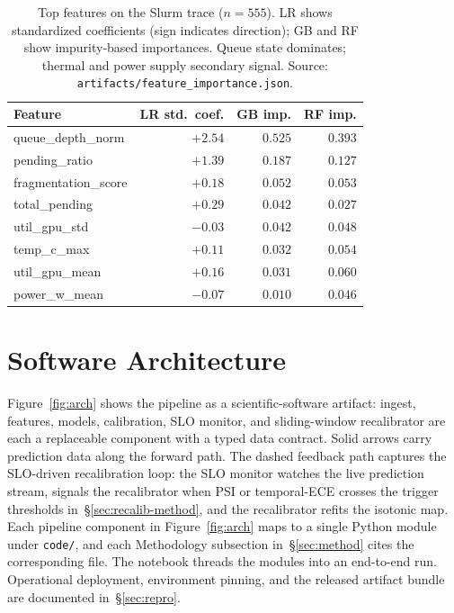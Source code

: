 \documentclass[conference]{IEEEtran}
\begin{document}
\begin{table}[!htbp]
\centering
\caption{Top features on the Slurm trace ($n=555$). LR shows standardized coefficients (sign indicates direction); GB and RF show impurity-based importances. Queue state dominates; thermal and power supply secondary signal. Source: \texttt{artifacts/feature\_importance.json}.}
\label{tab:featimp}
\scriptsize
\setlength{\tabcolsep}{4pt}
\begin{tabular}{@{}lrrr@{}}
\toprule
\textbf{Feature} & \textbf{LR std.\ coef.} & \textbf{GB imp.} & \textbf{RF imp.} \\
\midrule
queue\_depth\_norm  & $+2.54$ & $0.525$ & $0.393$ \\
pending\_ratio      & $+1.39$ & $0.187$ & $0.127$ \\
fragmentation\_score & $+0.18$ & $0.052$ & $0.053$ \\
total\_pending      & $+0.29$ & $0.042$ & $0.027$ \\
util\_gpu\_std      & $-0.03$ & $0.042$ & $0.048$ \\
temp\_c\_max        & $+0.11$ & $0.032$ & $0.054$ \\
util\_gpu\_mean     & $+0.16$ & $0.031$ & $0.060$ \\
power\_w\_mean      & $-0.07$ & $0.010$ & $0.046$ \\
\bottomrule
\end{tabular}
\end{table}

\section{Software Architecture}
\label{sec:arch}
Figure~\ref{fig:arch} shows the pipeline as a scientific-software artifact: ingest, features, models, calibration, SLO monitor, and sliding-window recalibrator are each a replaceable component with a typed data contract. Solid arrows carry prediction data along the forward path. The dashed feedback path captures the SLO-driven recalibration loop: the SLO monitor watches the live prediction stream, signals the recalibrator when PSI or temporal-ECE crosses the trigger thresholds in~\S\ref{sec:recalib-method}, and the recalibrator refits the isotonic map. Each pipeline component in Figure~\ref{fig:arch} maps to a single Python module under \texttt{code/}, and each Methodology subsection in~\S\ref{sec:method} cites the corresponding file. The notebook threads the modules into an end-to-end run. Operational deployment, environment pinning, and the released artifact bundle are documented in~\S\ref{sec:repro}.
\end{document}
